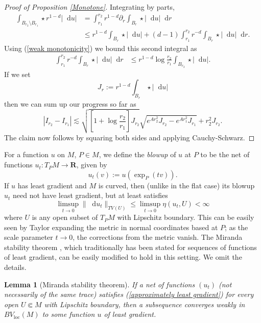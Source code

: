 \documentclass[reqno,11pt]{amsart}
\newcommand{\RR}{\mathbf{R}}
\newcommand*\dif{\mathop{}\!\mathrm{d}}
\newcommand{\dfn}[1]{\emph{#1}\index{#1}}
\newcommand{\loc}{\mathrm{loc}}
\newtheorem{lemma}[theorem]{Lemma}
\theoremstyle{definition}
\numberwithin{equation}{section}
\begin{document}
\begin{proof}[Proof of Proposition \ref{Monotone}]
Integrating by parts,
\begin{align*}
\int_{B_{r_2} \setminus B_{r_1}} \star r^{1 - d} |\dif u| &= \int_{r_1}^{r_2} r^{1 - d} \partial_r \int_{B_r} \star |\dif u| \dif r \\
&\leq r^{1 - d} \int_{B_r} \star |\dif u| + (d - 1) \int_{r_1}^{r_2} r^{-d} \int_{B_r} \star |\dif u| \dif r.
\end{align*}
Using (\ref{weak monotonicity}) we bound this second integral as
\begin{align*}
\int_{r_1}^{r_2} r^{-d} \int_{B_r} \star |\dif u| \dif r &\leq r^{1 - d} \log \frac{r_2}{r_1} \int_{B_{r_2}} \star |\dif u|.
\end{align*}
If we set
$$J_r := r^{1 - d} \int_{B_r} \star |\dif u|$$
then we can sum up our progress so far as
$$|I_{r_2} - I_{r_1}| \lesssim \sqrt{\left[1 + \log \frac{r_2}{r_1}\right] J_{r_2}} \sqrt{e^{Ar_2^2} J_{r_2} - e^{Ar_1^2} J_{r_1}} + r_2^2 J_{r_2}.$$
The claim now follows by squaring both sides and applying Cauchy-Schwarz.
\end{proof}

For a function $u$ on $M$, $P \in M$, we define the \dfn{blowup} of $u$ at $P$ to be the net of functions $u_t: T_PM \to \RR$, given by
$$u_t(v) := u\left(\exp_P(tv)\right).$$
If $u$ has least gradient and $M$ is curved, then (unlike in the flat case) its blowup $u_t$ need not have least gradient, but at least satisfies 
\begin{equation}\label{approximately least gradient}
\limsup_{t \to 0} \|\dif u_t\|_{TV(U)} \leq \limsup_{t \to 0} \eta(u_t, U) < \infty 
\end{equation}
where $U$ is any open subset of $T_PM$ with Lipschitz boundary.
This can be easily seen by Taylor expanding the metric in normal coordinates based at $P$; as the scale parameter $t \to 0$, the corrections from the metric vanish.
The Miranda stability theorem \cite[Osservazione 3]{Miranda66}, which traditionally has been stated for sequences of functions of least gradient, can be easily modified to hold in this setting.
We omit the details.

\begin{lemma}[Miranda stability theorem]\label{Miranda convergence}
If a net of functions $(u_t)$ (not necessarily of the same trace) satisfies (\ref{approximately least gradient}) for every open $U \Subset M$ with Lipschitz boundary,
then a subsequence converges weakly in $BV_\loc(M)$ to some function $u$ of least gradient.
\end{lemma}
\end{document}
